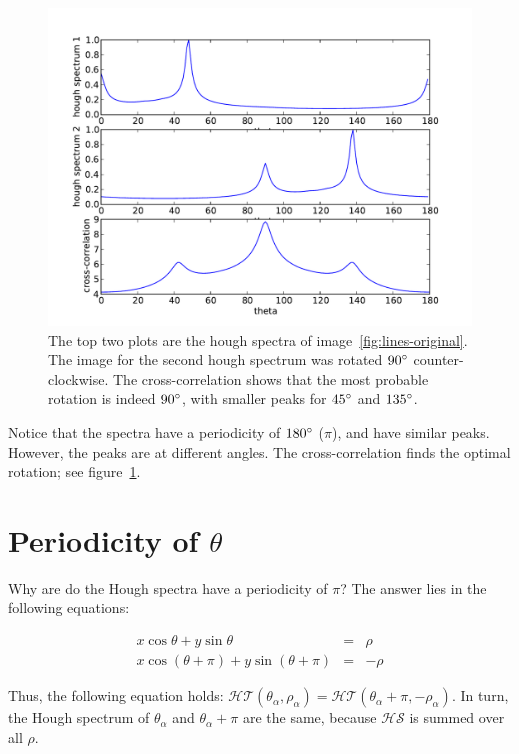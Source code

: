 \begin{figure}[ht]
	\centering
	\includegraphics[width=\textwidth]{images/stitching/lines-cross-correlation.pdf}
	\caption{The top two plots are the hough spectra of image~\ref{fig:lines-original}. The image for the second hough spectrum was rotated $90\degree$ counter-clockwise. The cross-correlation shows that the most probable rotation is indeed $90\degree$, with smaller peaks for $45\degree$ and $135\degree$.}
	\label{fig:lines-cross-correlation}
\end{figure}

Notice that the spectra have a periodicity of $180\degree$ ($\pi$), and have similar peaks. However, the peaks are at different angles. The cross-correlation finds the optimal rotation; see figure~\ref{fig:lines-cross-correlation}.

\section{Periodicity of $\theta$}
\label{sub:periodicity}
Why are do the Hough spectra have a periodicity of $\pi$? The answer lies in the following equations:

\begin{eqnarray}
x\cos \theta + y\sin \theta &=& \rho \\
x\cos(\theta + \pi) + y\sin (\theta + \pi) &=& -\rho
\end{eqnarray}

Thus, the following equation holds: $\mathcal{HT}(\theta_\alpha, \rho_\alpha) = \mathcal{HT}(\theta_\alpha + \pi, -\rho_\alpha)$. In turn, the Hough spectrum of $\theta_\alpha$ and $\theta_\alpha + \pi$ are the same, because $\mathcal{HS}$ is summed over all $\rho$. 

